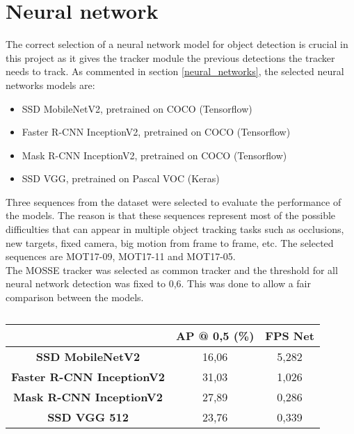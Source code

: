 \section{Neural network}
The correct selection of a neural network model for object detection is crucial in this project as it gives the tracker module the previous detections the tracker needs to track. As commented in section \ref{neural_networks}, the selected neural networks models are:
\begin{itemize}
    \item SSD MobileNetV2, pretrained on COCO (Tensorflow)
    \item Faster R-CNN InceptionV2, pretrained on COCO (Tensorflow)
    \item Mask R-CNN InceptionV2, pretrained on COCO (Tensorflow)
    \item SSD VGG, pretrained on Pascal VOC (Keras)
\end{itemize}
Three sequences from the dataset were selected to evaluate the performance of the models. The reason is that these sequences represent most of the possible difficulties that can appear in multiple object tracking tasks such as occlusions, new targets, fixed camera, big motion from frame to frame, etc. The selected sequences are MOT17-09, MOT17-11 and MOT17-05.\\
The MOSSE tracker was selected as common tracker and the threshold for all neural network detection was fixed to 0,6. This was done to allow a fair comparison between the models.
\begin{table}[H]
\tiny
\begin{center}
\begin{tabular}{|c|c|c|}
\hline
\textbf{}                         & \textbf{AP @ 0,5 (\%)} & \textbf{FPS Net} \\ \hline
\textbf{SSD MobileNetV2}          & 16,06                  & 5,282            \\ \hline
\textbf{Faster R-CNN InceptionV2} & 31,03                  & 1,026            \\ \hline
\textbf{Mask R-CNN InceptionV2}   & 27,89                  & 0,286            \\ \hline
\textbf{SSD VGG 512}              & 23,76                  & 0,339            \\ \hline
\end{tabular}
\end{center}
\caption{}
\label{tab:net_exp_1}
\end{table}
